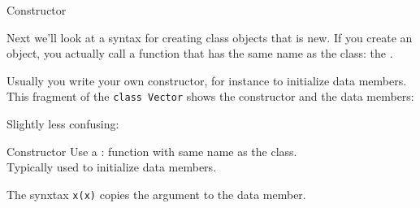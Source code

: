 \begin{comment}
  First of all, you can make an object look pretty much like a
  structure:
  \snippetwithoutput{pointstruct}{geom}{pointstruct}

  Observations about the above code snippet:
  \begin{itemize}
  \item Again we have separate definition of the class and declaration
    of the objects. You define the class only once, after which you can
    make as many objects of that class as you want.
  \item There are data members. We will get to the \indextermtt{public} in a
    minute.
  \item You make an object of that class by using the class name as the
    datatype.
  \item The data members can be accessed with the period.
  \end{itemize}

  \begin{slide}{Classes look a bit like structures}
    \label{sl:class-struct}
    \snippetwithoutput{pointstruct}{geom}{pointstruct}

    Class definition versus object declaration.\\
    We'll get to that `\lstinline{public}' in a minute.
  \end{slide}
\end{comment}

 {Constructor}

Next we'll look at a syntax for creating class objects that is new. If
you create an object, you actually call a function that has the same
name as the class: the .

Usually you write your own constructor,
for instance to initialize data members.
This fragment of the \lstinline{class Vector}
shows the constructor and the data members:
%
\begin{multicols}{2}
  \vfill\hbox{}
  \columnbreak
  Slightly less confusing:
  \vfill\hbox{}
\end{multicols}

\begin{slide}{Constructor}
  \label{sl:class-construct}
  Use a : function with same name as the
  class.\\
  Typically used to initialize data members.
  

  The synxtax \lstinline{x(x)} copies the argument to the data member.
\end{slide}

